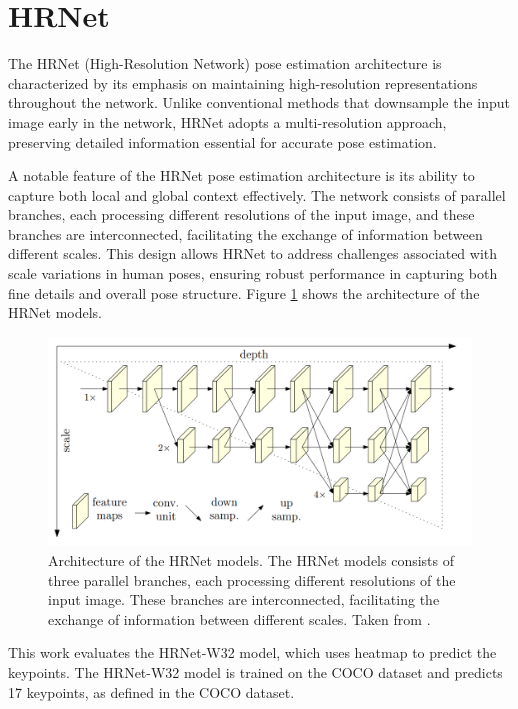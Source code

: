 \section{HRNet}
\label{hrnet}

The HRNet (High-Resolution Network) \cite{hrnet} pose estimation architecture is characterized by its emphasis on maintaining high-resolution representations throughout the network. Unlike conventional methods that downsample the input image early in the network, HRNet adopts a multi-resolution approach, preserving detailed information essential for accurate pose estimation.

A notable feature of the HRNet pose estimation architecture is its ability to capture both local and global context effectively. The network consists of parallel branches, each processing different resolutions of the input image, and these branches are interconnected, facilitating the exchange of information between different scales. This design allows HRNet to address challenges associated with scale variations in human poses, ensuring robust performance in capturing both fine details and overall pose structure. Figure \ref{fig:hrnet_architecture} shows the architecture of the HRNet models.

\begin{figure}[htbp]
    \centering
    \includegraphics[width=\textwidth]{obrazky-figures/hrnet_architecture.png}
    \caption{Architecture of the HRNet models. The HRNet models consists of three parallel branches, each processing different resolutions of the input image. These branches are interconnected, facilitating the exchange of information between different scales. Taken from \cite{hrnet}.}
    \label{fig:hrnet_architecture}
\end{figure}

This work evaluates the HRNet-W32 model, which uses heatmap to predict the keypoints. The HRNet-W32 model is trained on the COCO dataset and predicts 17 keypoints, as defined in the COCO dataset.


